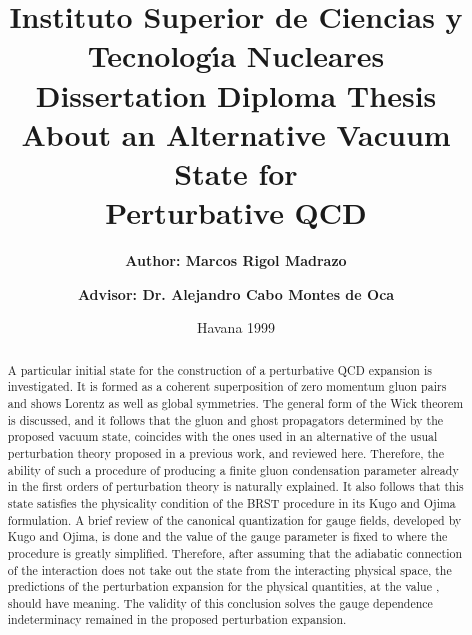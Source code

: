 \documentclass[12pt,letterpaper]{report}
\begin{document}
\title{Instituto Superior de Ciencias y Tecnolog\'{\i}a Nucleares \\
\vspace{2cm} Dissertation Diploma Thesis \\ \vspace{2.5cm} {\bf
About an Alternative Vacuum State for \\ Perturbative QCD \\
 \vspace{1.7cm}}}

\author{{\bf Author: Marcos Rigol Madrazo} \\ \vspace{0.1cm} \and 
{\bf Advisor: Dr. Alejandro Cabo Montes de Oca}}

\date{\vspace{1cm} Havana 1999}

\maketitle

\begin{abstract}

A particular initial state for the construction of a perturbative
QCD expansion is investigated. It is formed as a coherent
superposition of zero momentum gluon pairs and shows Lorentz as
well as global \coordHE{} symmetries. The general form of the Wick
theorem is discussed, and it follows that the gluon and ghost
propagators determined by the proposed vacuum state, coincides
with the ones used in an alternative of the usual perturbation
theory proposed in a previous work, and reviewed here. Therefore,
the ability of such a procedure of producing a finite gluon
condensation parameter already in the first orders of perturbation
theory is naturally explained. It also follows that this state
satisfies the physicality condition of the BRST procedure in its
Kugo and Ojima formulation. A brief review of the canonical
quantization for gauge fields, developed by Kugo and Ojima, is
done and the value of the gauge parameter \myHighlight{$\alpha$}\coordHE{} is fixed to
\coordHE{} where the procedure is greatly simplified. Therefore,
after assuming that the adiabatic connection of the interaction
does not take out the state from the interacting physical space,
the predictions of the perturbation expansion for the physical
quantities, at the value \coordHE{}, should have meaning. The
validity of this conclusion solves the gauge dependence
indeterminacy remained in the proposed perturbation expansion.

\end{abstract}
\end{document}
